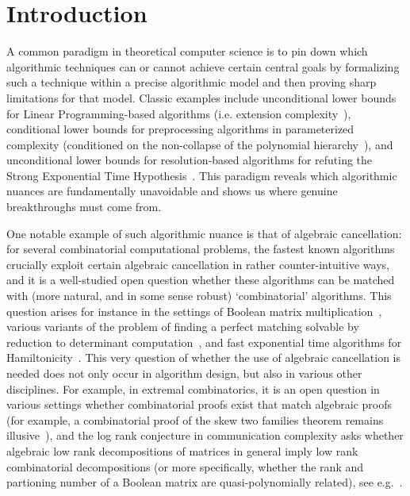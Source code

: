 
\section{Introduction}
A common paradigm in theoretical computer science is to pin down which algorithmic techniques can or cannot achieve certain central goals by formalizing such a technique within a precise algorithmic model and then proving sharp limitations for that model. Classic examples include unconditional lower bounds for Linear Programming-based algorithms (i.e. extension complexity~\cite{FioriniMPTW15,Rothvoss17}), conditional lower bounds for preprocessing algorithms in parameterized complexity (conditioned on the non-collapse of the polynomial hierarchy~\cite{BodlaenderDFH09,FortnowS11}), and unconditional lower bounds for resolution-based algorithms for refuting the Strong Exponential Time Hypothesis~\cite{BeckI13}. This paradigm reveals which algorithmic nuances are fundamentally unavoidable and shows us where genuine breakthroughs must come from.

One notable example of such algorithmic nuance is that of algebraic cancellation: for several combinatorial computational problems, the fastest known algorithms crucially exploit certain algebraic cancellation in rather counter-intuitive ways, and it is a well-studied open question whether these algorithms can be matched with (more natural, and in some sense robust) `combinatorial' algorithms. This question arises for instance in the settings of Boolean matrix multiplication~\cite{WilliamsW18}, various variants of the problem of finding a perfect matching solvable by reduction to determinant computation~\cite{KarpUW86,MulmuleyVV87}, and fast exponential time algorithms for Hamiltonicity~\cite{Bjorklund14}. This very question of whether the use of algebraic cancellation is needed does not only occur in algorithm design, but also in various other disciplines. For example, in extremal combinatorics, it is an open question in various settings whether combinatorial proofs exist that match algebraic proofs (for example, a combinatorial proof of the skew two families theorem remains illusive~\cite{calbet2023k_r}), and the log rank conjecture in communication complexity asks whether algebraic low rank decompositions of matrices in general imply low rank combinatorial decompositions (or more specifically, whether the rank and partioning number of a Boolean matrix are quasi-polynomially related), see e.g.~\cite{LovettA14}.

